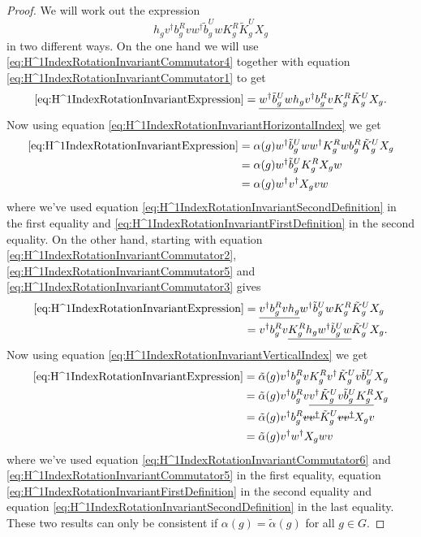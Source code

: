 \documentclass[11pt,a4paper,twoside]{article}
\numberwithin{equation}{section}
\begin{document}
	\begin{proof}
		We will work out the expression
		\begin{equation}\label{eq:H^1IndexRotationInvariantExpression}
			h_g v^\dagger b_g^R v w^\dagger\tilde{b}_g^U w K_g^R\tilde{K}_g^U X_g
		\end{equation}
		in two different ways. On the one hand we will use \eqref{eq:H^1IndexRotationInvariantCommutator4} together with equation \eqref{eq:H^1IndexRotationInvariantCommutator1} to get
		\begin{equation}
			\eqref{eq:H^1IndexRotationInvariantExpression}= \underline{w^\dagger\tilde{b}_g^U w h_g v^\dagger b_g^R v} K_g^R\tilde{K}_g^U X_g.
		\end{equation}
		Now using equation \eqref{eq:H^1IndexRotationInvariantHorizontalIndex} we get
		\begin{align}
			\eqref{eq:H^1IndexRotationInvariantExpression}&=\alpha(g)w^\dagger\tilde{b}_g^U w w^\dagger K_g^R w b_g^R\tilde{K}_g^U X_g\\
			&=\alpha(g)w^\dagger\tilde{b}_g^U  K_g^R X_g w\\
			&=\alpha(g)w^\dagger v^\dagger X_g v w
		\end{align}
		where we've used equation \eqref{eq:H^1IndexRotationInvariantSecondDefinition} in the first equality and \eqref{eq:H^1IndexRotationInvariantFirstDefinition} in the second equality. On the other hand, starting with equation \eqref{eq:H^1IndexRotationInvariantCommutator2}, \eqref{eq:H^1IndexRotationInvariantCommutator5} and \eqref{eq:H^1IndexRotationInvariantCommutator3} gives
		\begin{align}
			\eqref{eq:H^1IndexRotationInvariantExpression}&= \underline{v^\dagger b_g^R v h_g} w^\dagger\tilde{b}_g^U w K_g^R\tilde{K}_g^U X_g\\
			&=v^\dagger b_g^R v \underline{K_g^R h_g w^\dagger\tilde{b}_g^U w} \tilde{K}_g^U X_g.
		\end{align}
		Now using equation \eqref{eq:H^1IndexRotationInvariantVerticalIndex} we get
		\begin{align}
			\eqref{eq:H^1IndexRotationInvariantExpression}&=\tilde{\alpha}(g)v^\dagger b_g^R v K_g^R v^\dagger \tilde{K}_g^U v \tilde{b}_g^U X_g\\
			&=\tilde{\alpha}(g)v^\dagger b_g^R v \underline{v^\dagger \tilde{K}_g^U v \tilde{b}_g^U K_g^R} X_g\\
			&=\tilde{\alpha}(g)v^\dagger b_g^R \stkout{v v^\dagger} \tilde{K}_g^U \stkout{v v^\dagger} X_g v\\
			&=\tilde{\alpha}(g) v^\dagger w^\dagger X_g w v
		\end{align}
		where we've used equation \eqref{eq:H^1IndexRotationInvariantCommutator6} and \eqref{eq:H^1IndexRotationInvariantCommutator5} in the first equality, equation \eqref{eq:H^1IndexRotationInvariantFirstDefinition} in the second equality and equation \eqref{eq:H^1IndexRotationInvariantSecondDefinition} in the last equality. These two results can only be consistent if $\alpha(g)=\tilde{\alpha}(g)$ for all $g\in G$.
	\end{proof}
\end{document}

